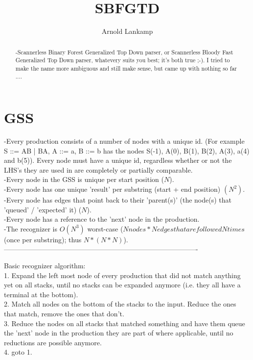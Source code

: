 \documentclass[a4paper,10pt]{article}
\title{SBFGTD}
\author{Arnold Lankamp}
\begin{document}
\maketitle

\begin{abstract}

-Scannerless Binary Forest Generalized Top Down parser, or Scannerless Bloody Fast Generalized Top Down parser, whatevery suits you best; it's both true ;-). I tried to make the name more ambiguous and still make sense, but came up with nothing so far ....\\

\end{abstract}

\section{GSS}

-Every production consists of a number of nodes with a unique id. (For example S ::= AB | BA, A ::= a, B ::= b has the nodes S(-1), A(0), B(1), B(2), A(3), a(4) and b(5)). Every node must have a unique id, regardless whether or not the LHS's they are used in are completely or partially comparable.\\
-Every node in the GSS is unique per start position ($N$).\\
-Every node has one unique 'result' per substring (start + end position) $(N^{2})$.\\
-Every node has edges that point back to their 'parent(s)' (the node(s) that 'queued' / 'expected' it) ($N$).\\
-Every node has a reference to the 'next' node in the production.\\
-The recognizer is $O(N^{3})$ worst-case ($N nodes * N edges that are followed N times$ (once per substring); thus $N * (N * N)$).\\

-------------------------------------------------------------------------------------

Basic recognizer algorithm:\\
1. Expand the left most node of every production that did not match anything yet on all stacks, until no stacks can be expanded anymore (i.e. they all have a terminal at the bottom).\\
2. Match all nodes on the bottom of the stacks to the input. Reduce the ones that match, remove the ones that don't.\\
3. Reduce the nodes on all stacks that matched something and have them queue the 'next' node in the production they are part of where applicable, until no reductions are possible anymore.\\
4. goto 1.\\
\end{document}
